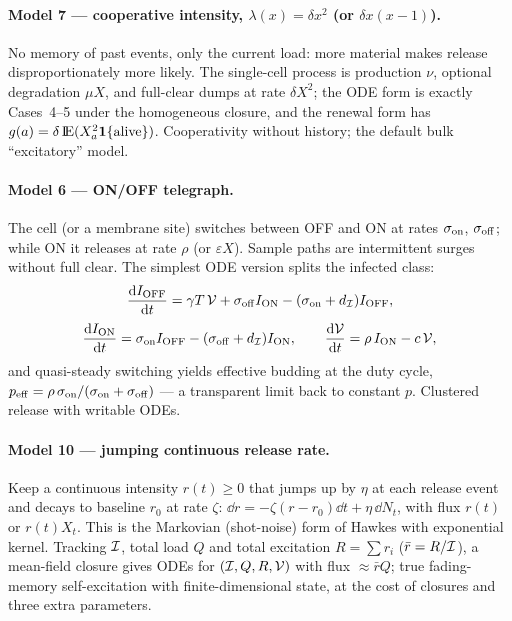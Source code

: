 \paragraph{Model 7 --- cooperative intensity, $\lambda(x)=\delta x^2$
(or $\delta x(x-1)$).} No memory of past events, only the current load:
more material makes release disproportionately more likely. The single-cell
process is production $\nu$, optional degradation $\mu X$, and full-clear
dumps at rate $\delta X^2$; the ODE form is exactly Cases~4--5 under the
homogeneous closure, and the renewal form has
$g(a)=\delta\,{\rm I}\!{\rm E}(X_a^2\mathbf1\{\text{alive}\})$. Cooperativity without
history; the default bulk ``excitatory'' model.

\paragraph{Model 6 --- ON/OFF telegraph.} The cell (or a membrane site)
switches between OFF and ON at rates $\sigma_{\rm on}$, $\sigma_{\rm off}$;
while ON it releases at rate $\rho$ (or $\varepsilon X$). Sample paths are
intermittent surges without full clear. The simplest ODE version splits the
infected class:
\begin{equation}
\displaystyle\frac{{\rm d} I_{\rm OFF}}{{\rm d} t}=\gamma T\,\mathcal{V}+\sigma_{\rm off}I_{\rm ON}
-(\sigma_{\rm on}+d_{\mathcal{I}})I_{\rm OFF},
\end{equation}
\begin{equation}
\displaystyle\frac{{\rm d} I_{\rm ON}}{{\rm d} t}=\sigma_{\rm on}I_{\rm OFF}
-(\sigma_{\rm off}+d_{\mathcal{I}})I_{\rm ON},
\qquad
\displaystyle\frac{{\rm d} \mathcal{V}}{{\rm d} t}=\rho\,I_{\rm ON}-c\,\mathcal{V},
\end{equation}
and quasi-steady switching yields effective budding at the duty cycle,
$p_{\rm eff}=\rho\,\sigma_{\rm on}/(\sigma_{\rm on}+\sigma_{\rm off})$ ---
a transparent limit back to constant $p$. Clustered release with writable
ODEs.

\paragraph{Model 10 --- jumping continuous release rate.} Keep a continuous
intensity $r(t)\ge0$ that jumps up by $\eta$ at each release event and
decays to baseline $r_0$ at rate $\zeta$:
$\dd r=-\zeta(r-r_0)\dd t+\eta\,\dd N_t$, with flux $r(t)$ or $r(t)X_t$.
This is the Markovian (shot-noise) form of Hawkes with exponential kernel.
Tracking $\mathcal{I}$, total load $Q$ and total excitation $R=\sum r_i$
($\bar r=R/\mathcal{I}$), a mean-field closure gives ODEs for
$(\mathcal{I},Q,R,\mathcal{V})$ with flux $\approx\bar r Q$; true fading-memory
self-excitation with finite-dimensional state, at the cost of closures and
three extra parameters.

